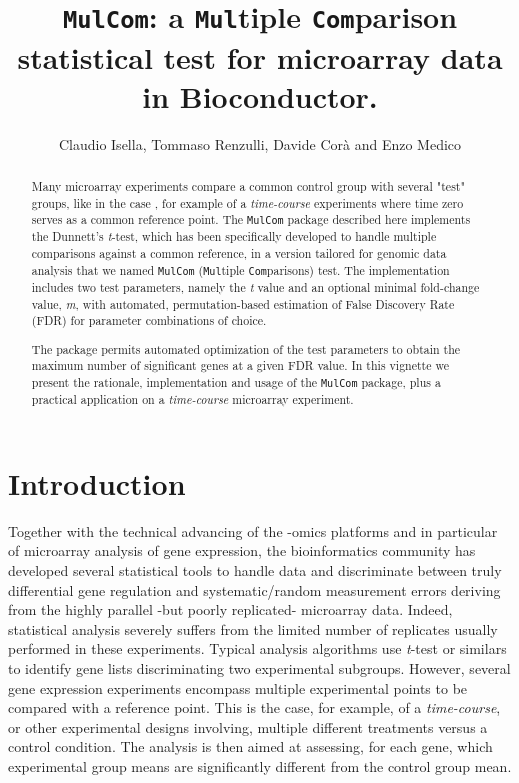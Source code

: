 \documentclass[a4paper]{article}
\begin{document}
\title{\texttt{MulCom}: a \texttt{Mul}tiple \texttt{Com}parison statistical test for microarray 
data in Bioconductor.}

\author{Claudio Isella, Tommaso Renzulli, Davide Cor\`a and Enzo Medico}

\maketitle

\vspace{12pt}

\begin{abstract}
Many microarray experiments compare a common control group
with several "test" groups, like in the case , for example of a \emph{time-course} experiments 
where time zero serves as a common reference point. The \texttt{MulCom} 
package described here implements the Dunnett's \emph{t}-test, which has been 
specifically developed to handle multiple comparisons against a common 
reference, in a version tailored for genomic data analysis that we named 
\texttt{MulCom} (\texttt{Mul}tiple \texttt{Com}parisons) test. 
The implementation includes two test parameters, namely the \emph{t} value and 
an optional minimal fold-change value, \emph{m}, with automated, 
permutation-based estimation of False Discovery Rate (FDR) for parameter 
combinations of choice.
 
The package permits automated optimization of the test parameters to obtain the 
maximum number of significant genes at a given FDR value. In this vignette we 
present the rationale, implementation and usage of the \texttt{MulCom} package, 
plus a practical application on a \emph{time-course} microarray experiment.

\end{abstract}
\newpage
\tableofcontents
\newpage
\section{Introduction}
Together with the technical advancing of the -omics platforms and in particular 
of microarray analysis of gene expression, the bioinformatics community has 
developed several statistical tools to handle data and discriminate between truly 
differential gene regulation and systematic/random measurement errors deriving 
from the highly parallel -but poorly replicated- microarray data. Indeed, statistical 
analysis severely suffers from the limited number of replicates usually performed in 
these experiments. Typical analysis algorithms use \emph{t}-test or similars to identify 
gene lists discriminating two experimental subgroups. However, several gene 
expression experiments encompass multiple experimental points to be compared 
with a reference point. This is the case, for example, of a \emph{time-course}, or other experimental designs involving,  
multiple different treatments versus a control condition. The analysis 
is then aimed at assessing, for each gene, which experimental group means are 
significantly different from the control group mean. 
\end{document}
